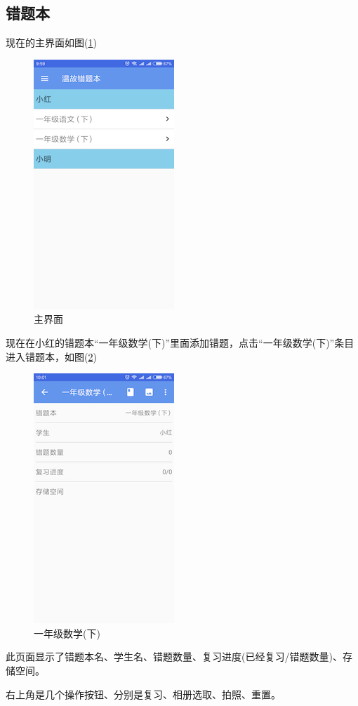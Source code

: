 \subsection{错题本}
现在的主界面如图(\ref{img18})
\begin{figure}[H]
	\centering
	\includegraphics{img/18.png}
	\caption{主界面}
	\label{img18}
\end{figure}
现在在小红的错题本“一年级数学(下)”里面添加错题，点击“一年级数学(下)”条目进入错题本，如图(\ref{img19})
\begin{figure}[H]
	\centering
	\includegraphics{img/19.png}
	\caption{一年级数学(下)}
	\label{img19}
\end{figure}
此页面显示了错题本名、学生名、错题数量、复习进度(已经复习/错题数量)、存储空间。

右上角是几个操作按钮、分别是复习、相册选取、拍照、重置。

